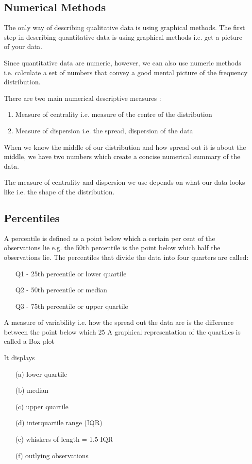 
\subsection{Numerical Methods}
The only way of describing qualitative data is using graphical methods. 
The first step in describing quantitative data is using graphical methods i.e. get a picture of your data. 

Since quantitative data are numeric, however, we can also use numeric methods i.e. calculate a set of numbers that convey a good mental picture of the frequency distribution. 

There are two main numerical descriptive measures :

\begin{enumerate}
\item Measure of centrality i.e. measure of the centre of the distribution
\item Measure of dispersion i.e. the spread, dispersion of the data
\end{enumerate}
When we know the middle of our distribution and how spread out it is about the middle, we have two numbers which create a concise numerical summary of the data. 

The measure of centrality and dispersion we use depends on what our data looks like i.e. the shape of the distribution.

\subsection{Percentiles}
A percentile is defined as a point below which a certain per cent of the observations lie e.g. the 50th percentile is the point below which half the observations lie. The percentiles that divide the data into four quarters are called: 
\begin{itemize}
\item[Q1] - 25th percentile or lower quartile
\item[Q2] - 50th percentile or median
\item[Q3] - 75th percentile or upper quartile
\end{itemize}

A measure of variability i.e. how the spread out the data are  is the difference between the point below which 25%
A graphical representation of the quartiles is called a Box plot 

It displays 
\begin{itemize}
\item[(a)] lower quartile 
\item[(b)] median 
\item[(c)] upper quartile  
\item[(d)] interquartile range (IQR)  
\item[(e)] whiskers of length = 1.5 IQR   
\item[(f)] outlying observations
\end{itemize}


